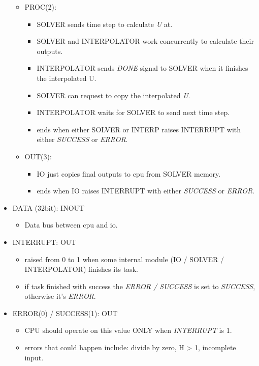 \documentclass[12pt]{extarticle}
\begin{document}
\begin{itemize}
\begin{itemize}
\begin{itemize}
        \end{itemize}
        \item PROC(2):
        \begin{itemize}
            \item SOLVER sends time step to calculate \emph{U} at.
            \item SOLVER and INTERPOLATOR work concurrently to calculate their outputs.
            \item INTERPOLATOR sends \emph{DONE} signal to SOLVER when it finishes the interpolated U.
            \item SOLVER can request to copy the interpolated \emph{U}.
            \item INTERPOLATOR waits for SOLVER to send next time step.
            \item ends when either SOLVER or INTERP raises INTERRUPT with either \emph{SUCCESS} or \emph{ERROR}.
        \end{itemize}
        \item OUT(3):
        \begin{itemize}
            \item IO just copies final outputs to cpu from SOLVER memory.
            \item ends when IO raises INTERRUPT with either \emph{SUCCESS} or \emph{ERROR}.
        \end{itemize}
    \end{itemize}
    \item DATA (32bit): INOUT
    \begin{itemize}
        \item Data bus between cpu and io.
    \end{itemize}
    \item INTERRUPT: OUT
    \begin{itemize}
        \item raised from 0 to 1 when some internal module (IO / SOLVER / INTERPOLATOR) finishes its task.
        \item if task finished with success the \emph{ERROR / SUCCESS} is set to \emph{SUCCESS}, otherwise it's \emph{ERROR}.
    \end{itemize}
    \item ERROR(0) / SUCCESS(1): OUT
    \begin{itemize}
        \item CPU should operate on this value ONLY when \emph{INTERRUPT} is 1.
        \item errors that could happen include: divide by zero, H > 1, incomplete input.
    \end{itemize}
\end{itemize}
\end{document}
